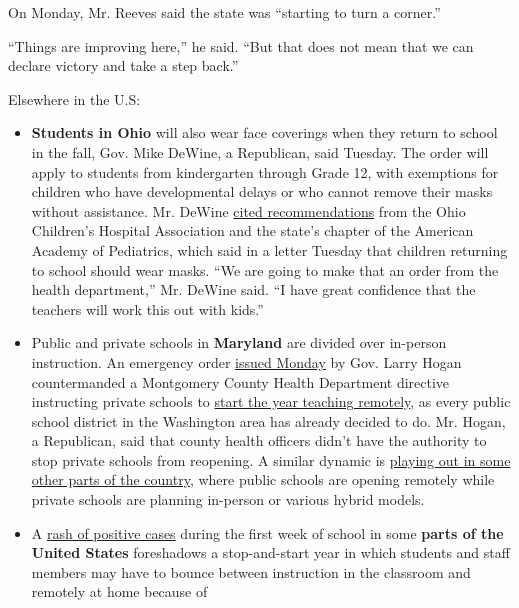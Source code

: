 On Monday, Mr. Reeves said the state was ``starting to turn a corner.''

``Things are improving here,'' he said. ``But that does not mean that we
can declare victory and take a step back.''

Elsewhere in the U.S:

\begin{itemize}
\item
  \textbf{Students in Ohio} will also wear face coverings when they
  return to school in the fall, Gov. Mike DeWine, a Republican, said
  Tuesday. The order will apply to students from kindergarten through
  Grade 12, with exemptions for children who have developmental delays
  or who cannot remove their masks without assistance. Mr. DeWine
  \href{https://twitter.com/GovMikeDeWine/status/1290715998102880259}{cited
  recommendations} from the Ohio Children's Hospital Association and the
  state's chapter of the American Academy of Pediatrics, which said in a
  letter Tuesday that children returning to school should wear masks.
  ``We are going to make that an order from the health department,'' Mr.
  DeWine said. ``I have great confidence that the teachers will work
  this out with kids.''
\item
  Public and private schools in \textbf{Maryland} are divided over
  in-person instruction. An emergency order
  \href{https://twitter.com/GovLarryHogan/status/1290330304830246912}{issued
  Monday} by Gov. Larry Hogan countermanded a Montgomery County Health
  Department directive instructing private schools to
  \href{https://www.montgomerycountymd.gov/OPI/Resources/Files/pdf/2020/NonPublicSchools_07-31-20.pdf}{start
  the year teaching remotely}, as every public school district in the
  Washington area has already decided to do. Mr. Hogan, a Republican,
  said that county health officers didn't have the authority to stop
  private schools from reopening. A similar dynamic is
  \href{https://www.nytimes.com/2020/07/16/upshot/coronavirus-school-reopening-private-public-gap.html}{playing
  out in some other parts of the country}, where public schools are
  opening remotely while private schools are planning in-person or
  various hybrid models.
\item
  A
  \href{https://www.nytimes.com/2020/08/03/us/school-closing-coronavirus.html}{rash
  of positive cases} during the first week of school in some
  \textbf{parts of the United States} foreshadows a stop-and-start year
  in which students and staff members may have to bounce between
  instruction in the classroom and remotely at home because of

\end{itemize}

